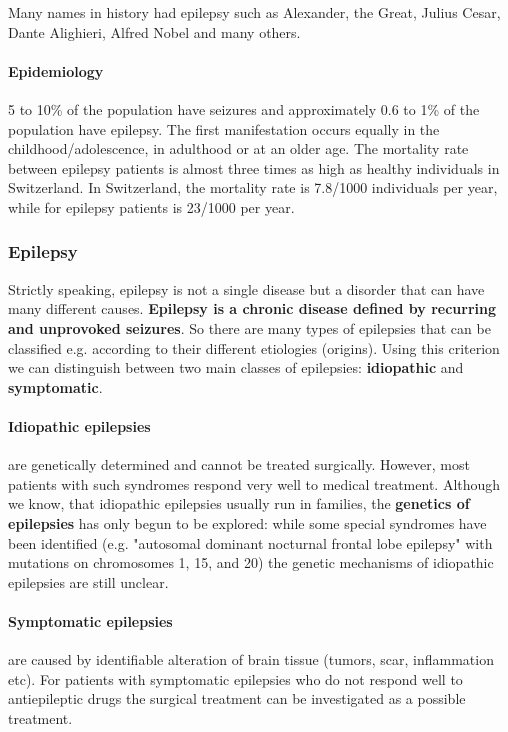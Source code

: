 \documentclass[12pt,article,oneside,a4paper]{memoir}
\begin{document}
Many names in history had epilepsy such as Alexander, the Great, Julius Cesar, Dante Alighieri, Alfred Nobel and many others.

\paragraph{Epidemiology}
5 to 10\% of the population have seizures and approximately 0.6 to 1\% of the population have epilepsy. The first manifestation occurs equally in the childhood/adolescence, in adulthood or at an older age.
The mortality rate between epilepsy patients is almost three times as high as healthy individuals in Switzerland. In Switzerland, the mortality rate is 7.8/1000 individuals per year, while for epilepsy patients is 23/1000 per year.

\subsubsection{Epilepsy}
Strictly speaking, epilepsy is not a single disease but a disorder that can have many different causes. \textbf{Epilepsy is a chronic disease defined by recurring and unprovoked seizures}.
So there are many types of epilepsies that can be classified e.g. according to their different etiologies (origins). Using this criterion we can distinguish between two main classes of epilepsies: \textbf{idiopathic} and \textbf{symptomatic}.

\paragraph{Idiopathic epilepsies} are genetically determined and cannot be treated surgically. However, most patients with such syndromes respond very well to medical treatment. Although we know, that idiopathic epilepsies usually run in families, the \textbf{genetics of epilepsies} has only begun to be explored: while some special syndromes have been identified (e.g. "autosomal dominant nocturnal frontal lobe epilepsy" with mutations on chromosomes 1, 15, and 20) the genetic mechanisms of idiopathic epilepsies are still unclear.

\paragraph{Symptomatic epilepsies} are caused by identifiable alteration of brain tissue (tumors, scar, inflammation etc). For patients with symptomatic epilepsies who do not respond well to antiepileptic drugs the surgical treatment can be investigated as a possible treatment.
\end{document}
